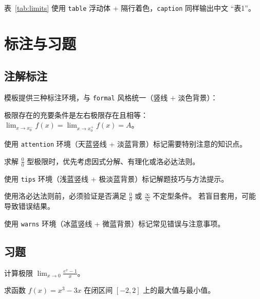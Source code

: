 \documentclass{harryopo-mathnotes}
\begin{document}
表~\ref{tab:limits} 使用 \texttt{table} 浮动体 + 隔行着色，\texttt{caption} 同样输出中文 ``表1''。

\section{标注与习题}

\subsection{注解标注}

模板提供三种标注环境，与 \texttt{formal} 风格统一（竖线 + 淡色背景）：

\begin{attention}
  极限存在的充要条件是左右极限存在且相等：$\displaystyle\lim_{x\to x_0^-}f(x)=\lim_{x\to x_0^+}f(x)=A$。

  使用 \texttt{attention} 环境（天蓝竖线 + 淡蓝背景）标记需要特别注意的知识点。
\end{attention}

\begin{tips}
  求解 $\frac{0}{0}$ 型极限时，优先考虑因式分解、有理化或洛必达法则。

  使用 \texttt{tips} 环境（浅蓝竖线 + 极淡蓝背景）标记解题技巧与方法提示。
\end{tips}

\begin{warns}
  使用洛必达法则前，必须验证是否满足 $\frac{0}{0}$ 或 $\frac{\infty}{\infty}$ 不定型条件。
  若盲目套用，可能导致错误结果。

  使用 \texttt{warns} 环境（冰蓝竖线 + 微蓝背景）标记常见错误与注意事项。
\end{warns}

\subsection{习题}

\begin{exercise}[极限计算]
  计算极限 $\displaystyle\lim_{x\to 0}\frac{e^x-1}{x}$。
\end{exercise}

\begin{exercise}[导数应用]
  求函数 $f(x)=x^3-3x$ 在闭区间 $[-2,2]$ 上的最大值与最小值。
\end{exercise}
\end{document}
